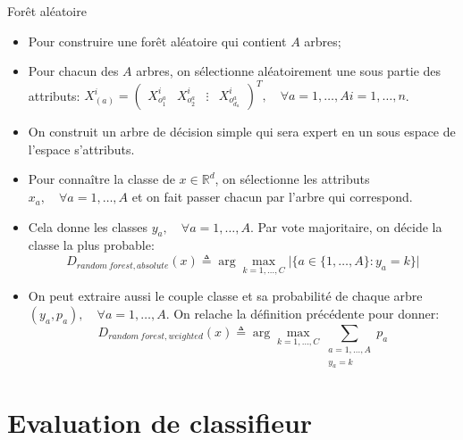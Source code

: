 \documentclass[8pt]{beamer}
\begin{document}
			\begin{frame}{Forêt aléatoire}
				\begin{itemize}
					\item<1-> Pour construire une forêt aléatoire qui contient \(A\) arbres;
					\item<2-> Pour chacun des \(A\) arbres, on sélectionne aléatoirement une sous partie des attributs: \(X^i_{(a)} = \begin{pmatrix}
						X^i_{o^a_1} & X^i_{o^a_2} & \vdots & X^i_{o^a_{d_a}}
					\end{pmatrix}^T, \quad \forall a = 1,\dots,A  i=1,\dots,n\).
					\item<3-> On construit un arbre de décision simple qui sera expert en un sous espace de l'espace s'attributs.
					\item<4-> Pour connaître la classe de \(x \in \mathbb{R}^d\), on sélectionne les attributs \(x_a, \quad \forall a = 1,\dots,A\) et on fait passer chacun par l'arbre qui correspond.
					\item<5-> Cela donne les classes \(y_a, \quad \forall a = 1,\dots,A\). Par vote majoritaire, on décide la classe la plus probable:
						\begin{equation}
							D_{random\ forest, absolute} (x) \triangleq \arg \max_{k=1,\dots,C} \vert \{a \in \{1,\dots,A\}: y_a = k\} \vert
						\end{equation}
					\item<6-> On peut extraire aussi le couple classe et sa probabilité de chaque arbre \((y_a, p_a), \quad \forall a = 1,\dots,A\). On relache la définition précédente pour donner:
						\begin{equation}
							D_{random\ forest, weighted} (x) \triangleq \arg \max_{k=1,\dots,C} \sum_{\substack{a=1,\dots,A\\y_a = k}} p_a
						\end{equation}
			\end{itemize}
			\end{frame}
	
	\section{Evaluation de classifieur}
\end{document}
